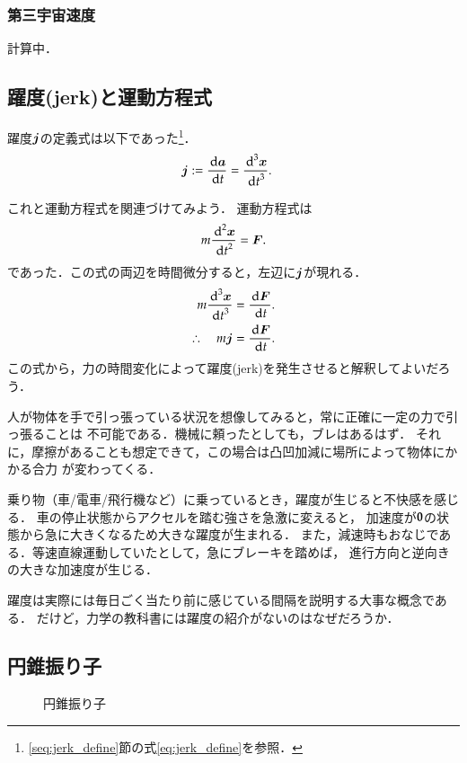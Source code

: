         \subsubsection{第三宇宙速度}
            計算中．


    \subsection{躍度(jerk)と運動方程式}
        躍度$\boldsymbol{j}$の定義式は以下であった\footnote{\ref{seq:jerk_define}節の式\eqref{eq:jerk_define}を参照．}．
        \begin{align*}
            \boldsymbol{j} &:= \frac{\,\mathrm{d} \boldsymbol{a}}{\,\mathrm{d} t} = \frac{{\,\mathrm{d}}^{3} \boldsymbol{x}}{{\,\mathrm{d} t}^{3}}.
        \end{align*}

        これと運動方程式を関連づけてみよう．
        運動方程式は
            \[
                m\frac{{\,\mathrm{d}}^{2} \boldsymbol{x}}{{\,\mathrm{d} t}^{2}} = \boldsymbol{F}.
            \]
        であった．この式の両辺を時間微分すると，左辺に$\boldsymbol{j}$が現れる．
        \begin{align*}
            m\frac{{\,\mathrm{d}}^{3} \boldsymbol{x}}{{\,\mathrm{d} t}^{3}} &= \frac{\,\mathrm{d} \boldsymbol{F}}{\,\mathrm{d} t}. \\
            \therefore \quad m\boldsymbol{j} &= \frac{\,\mathrm{d} \boldsymbol{F}}{\,\mathrm{d} t}.
        \end{align*}
        この式から，力の時間変化によって躍度(jerk)を発生させると解釈してよいだろう．

        人が物体を手で引っ張っている状況を想像してみると，常に正確に一定の力で引っ張ることは
        不可能である．機械に頼ったとしても，ブレはあるはず．
        それに，摩擦があることも想定できて，この場合は凸凹加減に場所によって物体にかかる合力
        が変わってくる．

        乗り物（車/電車/飛行機など）に乗っているとき，躍度が生じると不快感を感じる．
        車の停止状態からアクセルを踏む強さを急激に変えると，
        加速度が$\textbf{0}$の状態から急に大きくなるため大きな躍度が生まれる．
        また，減速時もおなじである．等速直線運動していたとして，急にブレーキを踏めば，
        進行方向と逆向きの大きな加速度が生じる．

        躍度は実際には毎日ごく当たり前に感じている間隔を説明する大事な概念である．
        だけど，力学の教科書には躍度の紹介がないのはなぜだろうか．




    \subsection{円錐振り子}
    \begin{figure}[hbt]
        \begin{center}
            \caption{円錐振り子}
            \label{fig:ensui_furiko}
        \end{center}
    \end{figure}

